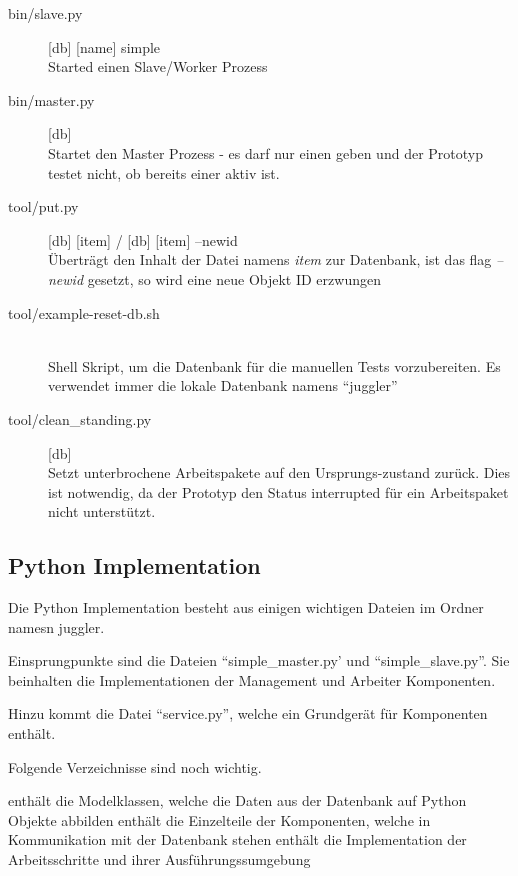 \begin{description}
    \item[bin/slave.py] [db] [name] simple \hfill \\
        Started einen Slave/Worker Prozess
    \item[bin/master.py] [db] \hfill \\
        Startet den Master Prozess - es darf nur einen geben und der Prototyp testet nicht, ob bereits einer aktiv ist.
    \item[tool/put.py] [db] [item] / [db] [item] --newid \hfill \\
        Überträgt den Inhalt der Datei namens \textit{item} zur Datenbank,
        ist das flag \textit{--newid} gesetzt, so wird eine neue Objekt ID erzwungen
    \item[tool/example-reset-db.sh] \hfill \\
        Shell Skript, um die Datenbank für die manuellen Tests vorzubereiten.
        Es verwendet immer die lokale Datenbank namens ``juggler''
    \item[tool/clean\_standing.py] [db]\hfill \\
        Setzt unterbrochene Arbeitspakete auf den Ursprungs-zustand zurück.
        Dies ist notwendig, da der Prototyp den Status interrupted für ein Arbeitspaket nicht unterstützt.
\end{description}

\subsection{Python Implementation}

Die Python Implementation besteht aus einigen wichtigen Dateien im Ordner namesn juggler.

Einsprungpunkte sind die Dateien ``simple\_master.py' und ``simple\_slave.py''.
Sie beinhalten die Implementationen der Management und Arbeiter Komponenten.

Hinzu kommt die Datei ``service.py'', welche ein Grundgerät für Komponenten enthält.

Folgende Verzeichnisse sind noch wichtig.

\begin{description}
    \dhitem[model] 
        enthält  die Modelklassen,
        welche die Daten aus der Datenbank auf Python Objekte abbilden
    \dhitem[handler] 
        enthält die Einzelteile der Komponenten,
        welche in Kommunikation mit der Datenbank stehen
    \dhitem[process]
        enthält die Implementation der Arbeitsschritte
        und ihrer Ausführungssumgebung
\end{description}



